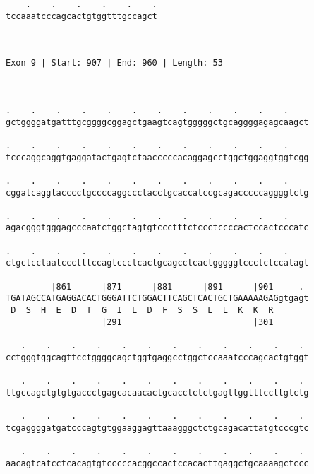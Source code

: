 \documentclass{article}
\begin{document}
\begin{Verbatim}
    .    .    .    .    .    .
tccaaatcccagcactgtggtttgccagct
                              
                              
 
Exon 9 | Start: 907 | End: 960 | Length: 53



.    .    .    .    .    .    .    .    .    .    .    .    
gctggggatgatttgcggggcggagctgaagtcagtgggggctgcaggggagagcaagct
                                                            
.    .    .    .    .    .    .    .    .    .    .    .    
tcccaggcaggtgaggatactgagtctaacccccacaggagcctggctggaggtggtcgg
                                                            
.    .    .    .    .    .    .    .    .    .    .    .    
cggatcaggtacccctgccccaggccctacctgcaccatccgcagacccccaggggtctg
                                                            
.    .    .    .    .    .    .    .    .    .    .    .    
agacgggtgggagcccaatctggctagtgtccctttctccctccccactccactcccatc
                                                            
.    .    .    .    .    .    .    .    .    .    .    .    
ctgctcctaatccctttccagtccctcactgcagcctcactgggggtccctctccatagt
                                                            
         |861      |871      |881      |891      |901     . 
TGATAGCCATGAGGACACTGGGATTCTGGACTTCAGCTCACTGCTGAAAAAGAGgtgagt
 D  S  H  E  D  T  G  I  L  D  F  S  S  L  L  K  K  R       
                   |291                          |301       
  
   .    .    .    .    .    .    .    .    .    .    .    . 
cctgggtggcagttcctggggcagctggtgaggcctggctccaaatcccagcactgtggt
                                                            
   .    .    .    .    .    .    .    .    .    .    .    . 
ttgccagctgtgtgaccctgagcacaacactgcacctctctgagttggtttccttgtctg
                                                            
   .    .    .    .    .    .    .    .    .    .    .    . 
tcgaggggatgatcccagtgtggaaggagttaaagggctctgcagacattatgtcccgtc
                                                            
   .    .    .    .    .    .    .    .    .    .    .    . 
aacagtcatcctcacagtgtcccccacggccactccacacttgaggctgcaaaagctccc
                                                            

\end{Verbatim}
\end{document}
